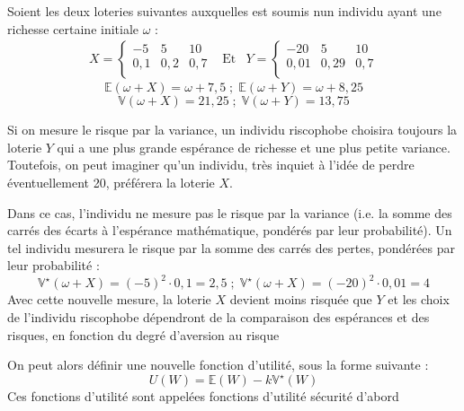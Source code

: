 \documentclass[a4paper, 12pt]{report}
\begin{document}
Soient les deux loteries suivantes auxquelles est soumis nun individu ayant une richesse certaine initiale $\omega$ :
$$
\begin{matrix}
	X=\left\{\begin{matrix}
		-5 & 5 & 10 \\
		0,1 & 0,2 & 0,7 \\
	\end{matrix}\right. & \text{Et} & Y=\left\{\begin{matrix}
		-20 & 5 & 10 \\
		0,01 & 0,29 & 0,7 \\
	\end{matrix}\right.
\end{matrix}
$$
$$
\mathbb{E}(\omega+X)=\omega+7,5 \; ; \;\mathbb{E}(\omega+Y)=\omega+8,25
$$
$$
\mathbb{V}(\omega+X)=21,25 \; ; \;\mathbb{V}(\omega+Y)=13,75
$$

Si on mesure le risque par la variance, un individu riscophobe choisira toujours la loterie $Y$ qui a une plus grande espérance de richesse et une plus petite variance. Toutefois, on peut imaginer qu'un individu, très inquiet à l'idée de perdre éventuellement 20, préférera la loterie $X$.

Dans ce cas, l'individu ne mesure pas le risque par la variance (i.e. la somme des carrés des écarts à l'espérance mathématique, pondérés par leur probabilité). Un tel individu mesurera le risque par la somme des carrés des pertes, pondérées par leur probabilité :
$$
\mathbb{V}^{\star}(\omega+X)=(-5)^2\cdot 0,1=2,5 \; ; \;\mathbb{V}^{\star}(\omega+X)=(-20)^2\cdot 0,01 =4
$$
Avec cette nouvelle mesure, la loterie $X$ devient moins risquée que $Y$ et les choix de l'individu riscophobe dépendront de la comparaison des espérances et des risques, en fonction du degré d'aversion au risque

On peut alors définir une nouvelle fonction d'utilité, sous la forme suivante :
$$
U(W)=\mathbb{E}(W)-k\mathbb{V}^{\star}(W)
$$
Ces fonctions d'utilité sont appelées fonctions d'utilité sécurité d'abord
\end{document}
